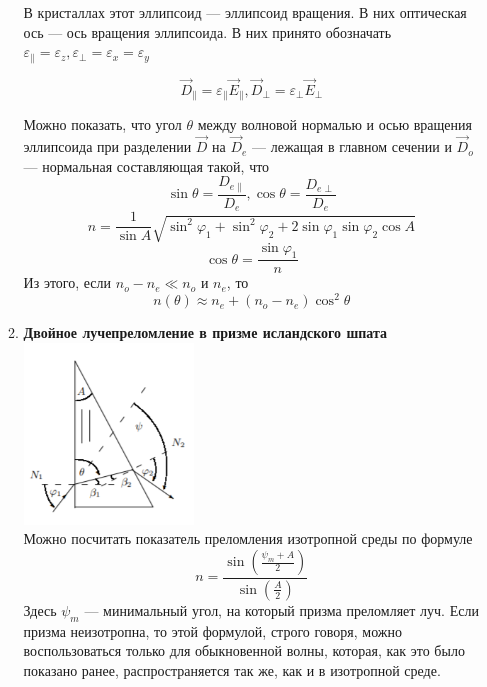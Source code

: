 \documentclass[a4paper]{article}
\begin{document}
\begin{multicols}{2}
\begin{enumerate}
\begin{enumerate}
В кристаллах этот эллипсоид --- эллипсоид вращения. В них оптическая ось --- ось вращения эллипсоида. В них принято обозначать $\varepsilon_{\parallel} = \varepsilon_z, \varepsilon_{\perp} = \varepsilon_x = \varepsilon_y$

\begin{equation}
\vec{D}_{\parallel} = \varepsilon_{\parallel} \vec{E}_{\parallel},\vec{D}_{\perp} = \varepsilon_{\perp} \vec{E}_{\perp} 
\end{equation}

Можно показать, что угол $\theta$ между волновой нормалью и осью вращения эллипсоида при разделении $\vec{D}$ на $\vec{D}_e$ --- лежащая в главном сечении и $\vec{D}_o$ --- нормальная составляющая такой, что
\begin{equation}
\sin \theta = \frac{D_{e\parallel}}{D_e}, \cos \theta = \frac{D_{e\perp}}{D_e}
\end{equation}
\begin{equation}
n = \frac{1}{\sin A}\sqrt{\sin^2 \varphi_1 + \sin^2 \varphi_2 + 2 \sin \varphi_1 \sin \varphi_2 \cos A}
\end{equation}
\begin{equation}
\cos \theta = \frac{\sin \varphi_1}{n}
\end{equation}
Из этого, если $n_o - n_e \ll n_o$ и $n_e$, то 
\begin{equation}
n(\theta) \approx n_e + (n_o - n_e) \cos^2 \theta
\end{equation}
\item \textbf{Двойное лучепреломление в призме исландского шпата}\\
\includegraphics[width = 4.5cm]{1}\\
Можно посчитать показатель преломления изотропной среды по формуле 
\begin{equation}
n = \frac{\sin\left(\frac{\psi_m + A}{2}\right)}{\sin \left(\frac{A}{2}\right)}
\end{equation}
Здесь $\psi_m$  --- минимальный угол, на который призма преломляет луч.
Если призма неизотропна, то этой формулой, строго говоря, можно воспользоваться только для обыкновенной волны, которая, как это было показано ранее, распространяется так же, как и в изотропной среде.

\end{enumerate}
\end{enumerate}
\end{multicols}
\end{document}
